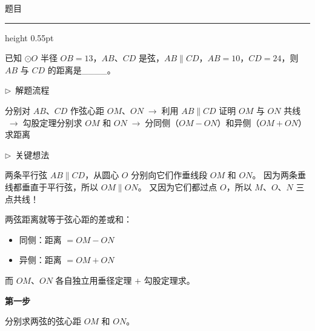 \documentclass{exam-zh}
\newcommand{\edukai}{\kaishu}
\newenvironment{eduSubQuestionItem}[1]{%
  \needspace{4\baselineskip}%
  \vspace{2mm}
  \par\noindent
  \hangindent=8mm\hangafter=1
  {\color{edu-blue}\bfseries #1}\enspace
  \begingroup
  \color{edu-ink}
}{%
  \endgroup
  \par
  \vspace{3mm}
}
\newenvironment{eduAuxItem}[1]{%
  \needspace{4\baselineskip}%
  \vspace{2mm}
  \par\noindent
  \hangindent=8mm\hangafter=1
  {\color{edu-blue}\edukai $\triangleright$~#1}\enspace
  \begingroup
  \color{edu-ink}
  \edukai
}{%
  \endgroup
  \par
  \vspace{4mm}
}
\newenvironment{eduProblemBlock}[1][题目]{%
  \needspace{8\baselineskip}
  {\small\color{edu-muted}#1}\par
  \vspace{1.5mm}
  {\color{edu-blue}\hrule height 0.55pt}
  \vspace{4.5mm}
  \begingroup
  \color{edu-ink}
  \large
  \setlength{\parskip}{2.2mm}
  \linespread{1.20}\selectfont
}{%
  \par
  \endgroup
  \vspace{6mm}
}
\begin{document}
\begin{eduProblemBlock}[题目]
已知 $\odot O$ 半径 $OB = 13$，$AB$、$CD$ 是弦，$AB \parallel CD$，$AB = 10$，$CD = 24$，则 $AB$ 与 $CD$ 的距离是\_\_\_\_。
\end{eduProblemBlock}









\begin{eduAuxItem}{解题流程}
分别对 $AB$、$CD$ 作弦心距 $OM$、$ON$$\;\to\;$利用 $AB \parallel CD$ 证明 $OM$ 与 $ON$ 共线$\;\to\;$勾股定理分别求 $OM$ 和 $ON$$\;\to\;$分同侧（$OM - ON$）和异侧（$OM + ON$）求距离\end{eduAuxItem}




\begin{eduAuxItem}{关键想法}
两条平行弦 $AB \parallel CD$，从圆心 $O$ 分别向它们作垂线段 $OM$ 和 $ON$。
因为两条垂线都垂直于平行弦，所以 $OM \parallel ON$。
又因为它们都过点 $O$，所以 $M$、$O$、$N$ 三点共线！

两弦距离就等于弦心距的差或和：
\begin{itemize}
  \item 同侧：距离 $= OM - ON$
  \item 异侧：距离 $= OM + ON$
\end{itemize}
而 $OM$、$ON$ 各自独立用垂径定理 $+$ 勾股定理求。
\end{eduAuxItem}




\begin{eduSubQuestionItem}{第一步}
分别求两弦的弦心距 $OM$ 和 $ON$。\end{eduSubQuestionItem}
\end{document}
